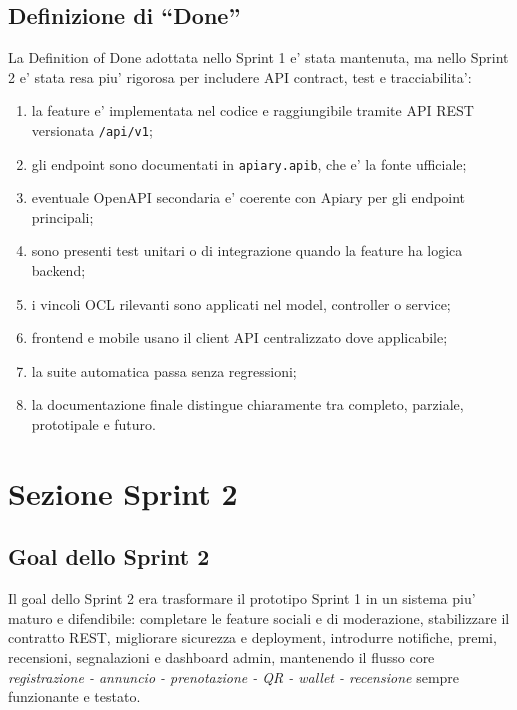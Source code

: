 \documentclass[11pt,a4paper]{article}
\newcommand{\code}[1]{\texttt{#1}}
\begin{document}
\subsection{Definizione di ``Done''}

La Definition of Done adottata nello Sprint 1 e' stata mantenuta, ma nello Sprint 2
e' stata resa piu' rigorosa per includere API contract, test e tracciabilita':

\begin{enumerate}
  \item la feature e' implementata nel codice e raggiungibile tramite API REST versionata \code{/api/v1};
  \item gli endpoint sono documentati in \code{apiary.apib}, che e' la fonte ufficiale;
  \item eventuale OpenAPI secondaria e' coerente con Apiary per gli endpoint principali;
  \item sono presenti test unitari o di integrazione quando la feature ha logica backend;
  \item i vincoli OCL rilevanti sono applicati nel model, controller o service;
  \item frontend e mobile usano il client API centralizzato dove applicabile;
  \item la suite automatica passa senza regressioni;
  \item la documentazione finale distingue chiaramente tra completo, parziale, prototipale e futuro.
\end{enumerate}

\section{Sezione Sprint 2}

\subsection{Goal dello Sprint 2}

Il goal dello Sprint 2 era trasformare il prototipo Sprint 1 in un sistema piu'
maturo e difendibile: completare le feature sociali e di moderazione, stabilizzare
il contratto REST, migliorare sicurezza e deployment, introdurre notifiche, premi,
recensioni, segnalazioni e dashboard admin, mantenendo il flusso core
\emph{registrazione - annuncio - prenotazione - QR - wallet - recensione} sempre
funzionante e testato.
\end{document}
